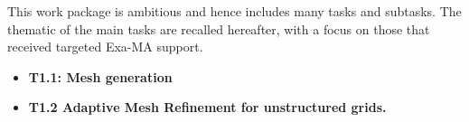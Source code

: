 This work package is ambitious and hence includes many tasks and subtasks. The thematic of the main tasks are recalled hereafter, with a focus on those that received targeted Exa-MA support.
\begin{itemize}
    \item {\bf T1.1: Mesh generation}\\
    \item {\bf T1.2 Adaptive Mesh Refinement for unstructured grids.} 

\end{itemize}
